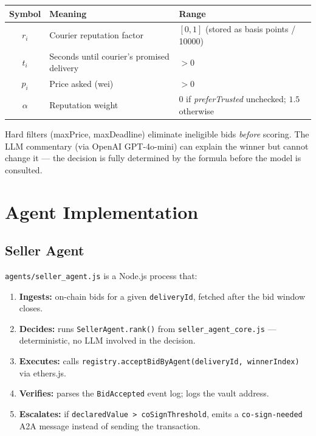 \documentclass[12pt,a4paper]{article}
\begin{document}
\begin{center}
\begin{tabular}{cll}
\toprule
Symbol & Meaning & Range \\
\midrule
$r_i$ & Courier reputation factor & $[0,1]$ (stored as basis points / 10000) \\
$t_i$ & Seconds until courier's promised delivery & $> 0$ \\
$p_i$ & Price asked (wei) & $> 0$ \\
$\alpha$ & Reputation weight & $0$ if \textit{preferTrusted} unchecked; $1.5$ otherwise \\
\bottomrule
\end{tabular}
\end{center}

Hard filters (maxPrice, maxDeadline) eliminate ineligible bids \emph{before} scoring. The LLM commentary (via OpenAI GPT-4o-mini) can explain the winner but cannot change it — the decision is fully determined by the formula before the model is consulted.

\section{Agent Implementation}

\subsection{Seller Agent}

\texttt{agents/seller\_agent.js} is a Node.js process that:

\begin{enumerate}
    \item \textbf{Ingests:} on-chain bids for a given \texttt{deliveryId}, fetched after the bid window closes.
    \item \textbf{Decides:} runs \texttt{SellerAgent.rank()} from \texttt{seller\_agent\_core.js} — deterministic, no LLM involved in the decision.
    \item \textbf{Executes:} calls \texttt{registry.acceptBidByAgent(deliveryId, winnerIndex)} via ethers.js.
    \item \textbf{Verifies:} parses the \texttt{BidAccepted} event log; logs the vault address.
    \item \textbf{Escalates:} if \texttt{declaredValue > coSignThreshold}, emits a \texttt{co-sign-needed} A2A message instead of sending the transaction.
\end{enumerate}
\end{document}
